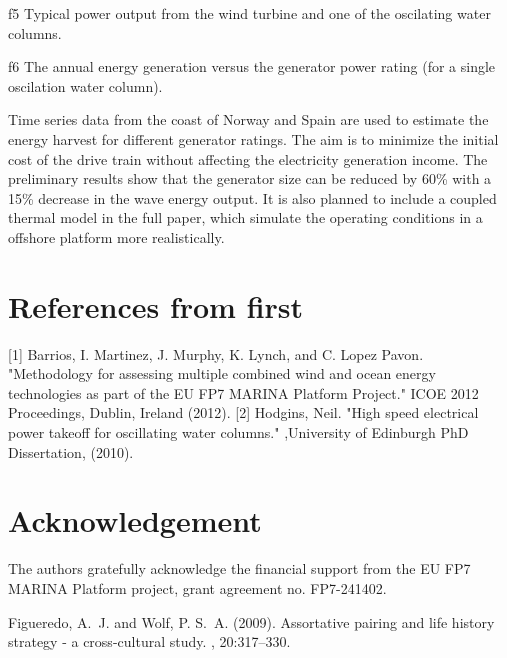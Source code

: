 \documentclass[twocolumn]{article}
\begin{document}
{f5} Typical power output from the wind turbine and one of the oscilating water columns.

{f6} The annual energy generation versus the generator power rating (for a single oscilation water column).

Time series data from the coast of Norway and Spain are used to estimate the energy harvest for different generator ratings. The aim is to minimize the initial cost of the drive train without affecting the electricity generation income. The preliminary results show that the generator size can be reduced by 60\% with a 15\% decrease in the wave energy output. It is also planned to include a coupled thermal model in the full paper, which simulate the operating conditions in a offshore platform more realistically.


\section{References from first} %
\label{sec:references_from_first}
[1] Barrios, I. Martinez, J. Murphy, K. Lynch, and C. Lopez Pavon. "Methodology for assessing multiple combined wind and ocean energy technologies as part of the EU FP7 MARINA Platform Project." ICOE 2012 Proceedings, Dublin, Ireland (2012).
[2] Hodgins, Neil. "High speed electrical power takeoff for oscillating water columns." ,University of Edinburgh PhD Dissertation, (2010).

\section*{Acknowledgement} %
\label{sec:acknowledgement}

The authors gratefully acknowledge the financial support
from the EU FP7 MARINA Platform project, grant agreement no. FP7-241402.


\begin{thebibliography}{99} %

Figueredo, A.~J. and Wolf, P. S.~A. (2009).
\newblock Assortative pairing and life history strategy - a cross-cultural
  study.
, 20:317--330.
 
\end{thebibliography}


\end{document}
